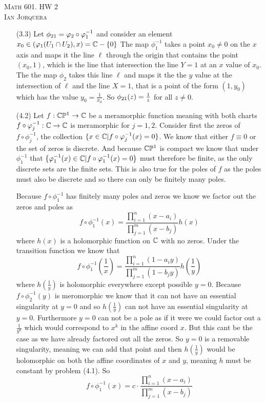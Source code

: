 \documentclass[12pt]{amsart}
\begin{document}
\begin{center}
    \textsc{Math 601. HW 2\\ Ian Jorquera}
\end{center}
\vspace{1em}
\begin{itemize}
\item[(3.3)] Let $\oldphi_{21}=\phi_{2}\circ \phi_1^{-1}$ and consider an element 
             $x_0\in(\varphi_1(U_1\cap U_2),x)=\mathbb{C}-\{0\}$
             The map $\phi_1^{-1}$ takes a point $x_0\neq 0$ on the $x$ axis and maps it the line $\ell$ 
             through the origin 
             that contains the point $(x_0,1)$, which is the line that intersection the line $Y=1$ 
             at an $x$ value of $x_0$. The the map $\phi_2$ takes this line $\ell$ and maps it the the $y$ value
             at the intersection of $\ell$ and the line $X=1$, that is a point of the form $(1,y_0)$ which has 
             the value $y_0=\frac{1}{x_0}$. So $\oldphi_{21}(z)=\frac{1}{z}$ for all $z\neq 0$. 


\item[(4.2)] Let $f:\mathbb{C}\mathbb{P}^1\rightarrow \mathbb{C}$ be a meramorphic function meaning with both 
charts $f\circ \varphi^{-1}_j:\mathbb{C}\rightarrow \mathbb{C}$ is meramorphic for $j=1,2$.
Consider first the zeros of $f\circ \phi^{-1}_j$, the collection 
$\{x\in \mathbb{C} | f\circ \varphi^{-1}_j(x)=0\}$. We know that either $f\equiv 0$ or the
set of zeros is discrete. And because $\mathbb{C}\mathbb{P}^1$ is compact we know that under $\phi^{-1}_1$ that 
$\{\varphi^{-1}_1(x)\in \mathbb{C} | f\circ \varphi^{-1}_1(x)=0\}$ must therefore be finite, 
as the only discrete sets are the finite sets. %
This is also true for the poles of $f$ as the poles must also be discrete and so there can only be 
finitely many poles.

Because $f\circ\phi_1^{-1}$ has finitely many poles and zeros we know we factor out the zeros and poles as 
\[f\circ\phi_1^{-1}(x)=\frac{\displaystyle{\prod^n_{i=1}(x-a_i)}}{\displaystyle{\prod_{j=1}^m(x-b_j)}}h(x)\]
where $h(x)$ is a holomorphic function on $\mathbb{C}$ with no zeros. 
Under the transition function we know that
\[f\circ\phi_1^{-1}\left(\frac{1}{x}\right)=\frac{\displaystyle{\prod^n_{i=1}(1-a_iy)}}{\displaystyle{\prod_{j=1}^m(1-b_jy)}}h\left(\frac{1}{y}\right)\]
where $h\left(\frac{1}{y}\right)$ is holomorphic everywhere except possible $y=0$.
Because $f\circ \phi_2^{-1}(y)$ is meromorphic we know that it can not have an essential singularity at $y=0$ 
and so $h\left(\frac{1}{y}\right)$ can not have an essential singularity at $y=0$.
Furthermore $y=0$ can not be a pole as if it were we could factor out a $\frac{1}{y^k}$ which would 
correspond to $x^k$ in the affine coord $x$. But this cant be the case as we have already factored out 
all the zeros. So
$y=0$ is a removable singularity, meaning we can add that point and then $h\left(\frac{1}{y}\right)$ 
would be holomorphic on both the affine coordinates of $x$ and $y$, meaning $h$ must be constant by problem (4.1).
So 
\[f\circ\phi_1^{-1}(x)=c\cdot\frac{\displaystyle{\prod^n_{i=1}(x-a_i)}}{\displaystyle{\prod_{j=1}^m(x-b_j)}}\]


\end{itemize}
\end{document}
